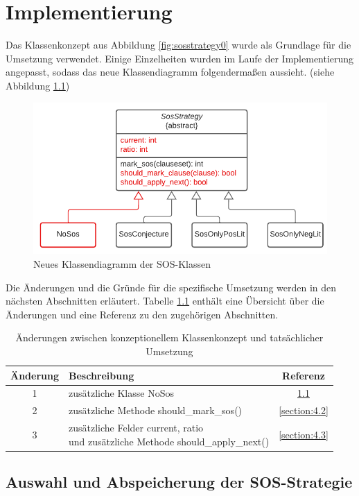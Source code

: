 
\chapter{Implementierung}

Das Klassenkonzept aus Abbildung \ref{fig:sosstrategy0} wurde als Grundlage für die Umsetzung verwendet. Einige Einzelheiten wurden im Laufe der Implementierung angepasst, sodass das neue Klassendiagramm folgendermaßen aussieht. (siehe Abbildung \ref{fig:sosstrategy1})

\begin{figure}[h]
	\centering
	\includegraphics[width=0.7\linewidth]{images/Lucid/SosStrategy1}
	\caption{Neues Klassendiagramm der SOS-Klassen}
	\label{fig:sosstrategy1}
\end{figure}


Die Änderungen und die Gründe für die spezifische Umsetzung werden in den nächsten Abschnitten erläutert. Tabelle \ref{table:difference_sos_classes} enthält eine Übersicht über die Änderungen und eine Referenz zu den zugehörigen Abschnitten.
\begin{table}[h]
	\centering
	\begin{tabular}{|c|l|c|}
		\hline
		Änderung & Beschreibung & Referenz \\
		\hline
		1 & zusätzliche Klasse NoSos & \ref{section:4.1} \\
		\hline
		2 & zusätzliche Methode should\_mark\_sos() & \ref{section:4.2} \\
		\hline
		3 & \cellbreak{l}{zusätzliche Felder current, ratio \\ und zusätzliche Methode should\_apply\_next()} & \ref{section:4.3} \\
		\hline
	\end{tabular}
	\caption{Änderungen zwischen konzeptionellem Klassenkonzept und tatsächlicher Umsetzung}
	\label{table:difference_sos_classes}
\end{table}

\section{Auswahl und Abspeicherung der SOS-Strategie}
\label{section:4.1}

